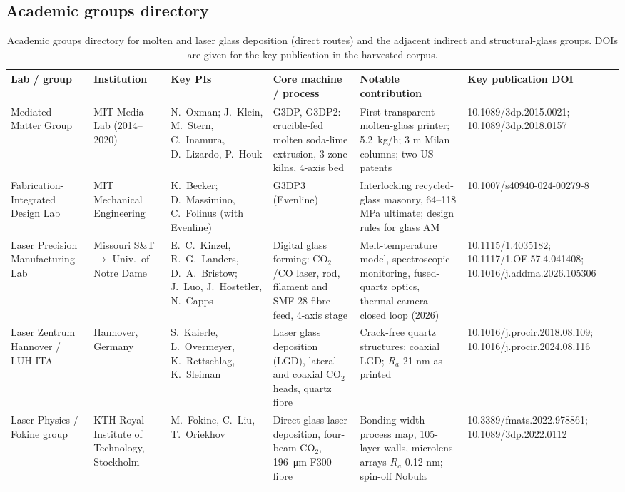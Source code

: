 \subsection{Academic groups directory}
\begin{table}
  \centering\scriptsize
  \caption{Academic groups directory for molten and laser glass deposition (direct routes) and the adjacent indirect and structural-glass groups. DOIs are given for the key publication in the harvested corpus.}
  \label{tab:academic}
  \begin{tabular}{@{}L{2.9cm}L{2.5cm}L{2.8cm}L{2.9cm}L{4.2cm}L{4.2cm}@{}}
    \toprule
    Lab / group & Institution & Key PIs & Core machine / process & Notable contribution & Key publication DOI\\
    \midrule
    Mediated Matter Group & MIT Media Lab (2014--2020) & N.\ Oxman; J.\ Klein, M.\ Stern, C.\ Inamura, D.\ Lizardo, P.\ Houk & G3DP, G3DP2: crucible-fed molten soda-lime extrusion, 3-zone kilns, 4-axis bed & First transparent molten-glass printer; \SI{5.2}{kg/h}; 3 m Milan columns; two US patents & 10.1089/3dp.2015.0021; 10.1089/3dp.2018.0157\\
    Fabrication-Integrated Design Lab & MIT Mechanical Engineering & K.\ Becker; D.\ Massimino, C.\ Folinus (with Evenline) & G3DP3 (Evenline) & Interlocking recycled-glass masonry, 64--118 MPa ultimate; design rules for glass AM & 10.1007/s40940-024-00279-8\\
    Laser Precision Manufacturing Lab & Missouri S\&T \(\rightarrow\) Univ.\ of Notre Dame & E.\ C.\ Kinzel, R.\ G.\ Landers, D.\ A.\ Bristow; J.\ Luo, J.\ Hostetler, N.\ Capps & Digital glass forming: CO\(_2\)/CO laser, rod, filament and SMF-28 fibre feed, 4-axis stage & Melt-temperature model, spectroscopic monitoring, fused-quartz optics, thermal-camera closed loop (2026) & 10.1115/1.4035182; 10.1117/1.OE.57.4.041408; 10.1016/j.addma.2026.105306\\
    Laser Zentrum Hannover / LUH ITA & Hannover, Germany & S.\ Kaierle, L.\ Overmeyer, K.\ Rettschlag, K.\ Sleiman & Laser glass deposition (LGD), lateral and coaxial CO\(_2\) heads, quartz fibre & Crack-free quartz structures; coaxial LGD; \(R_a\) 21 nm as-printed & 10.1016/j.procir.2018.08.109; 10.1016/j.procir.2024.08.116\\
    Laser Physics / Fokine group & KTH Royal Institute of Technology, Stockholm & M.\ Fokine, C.\ Liu, T.\ Oriekhov & Direct glass laser deposition, four-beam CO\(_2\), \SI{196}{\micro\metre} F300 fibre & Bonding-width process map, 105-layer walls, microlens arrays \(R_a\) 0.12 nm; spin-off Nobula & 10.3389/fmats.2022.978861; 10.1089/3dp.2022.0112\\

\end{tabular}
\end{table}
